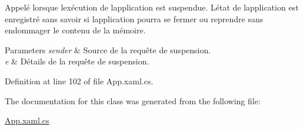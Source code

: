 Appelé lorsque l\textquotesingle{}exécution de l\textquotesingle{}application est suspendue. L\textquotesingle{}état de l\textquotesingle{}application est enregistré sans savoir si l\textquotesingle{}application pourra se fermer ou reprendre sans endommager le contenu de la mémoire. 


\begin{DoxyParams}{Parameters}
{\em sender} & Source de la requête de suspension.\\
\hline
{\em e} & Détails de la requête de suspension.\\
\hline
\end{DoxyParams}


Definition at line 102 of file App.\+xaml.\+cs.



The documentation for this class was generated from the following file\+:\begin{DoxyCompactItemize}
\item 
\hyperlink{_app_8xaml_8cs}{App.\+xaml.\+cs}\end{DoxyCompactItemize}
